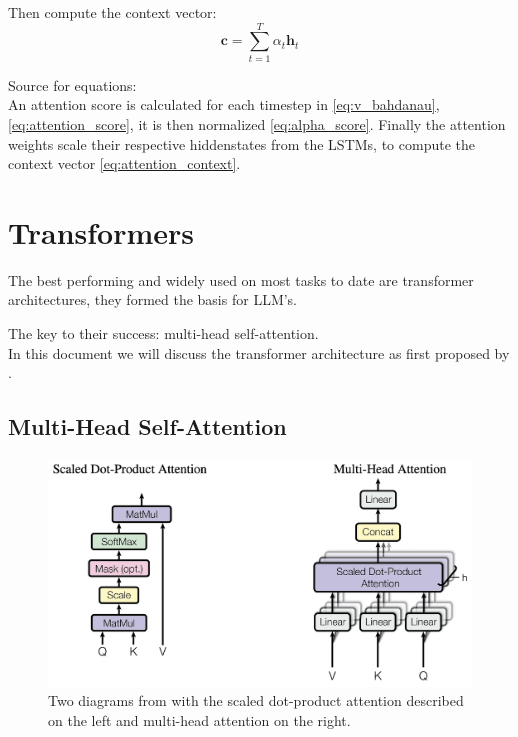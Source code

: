 \documentclass{article}
\begin{document}
Then compute the context vector:
\begin{equation}
    \mathbf{c} = \sum_{t=1}^{T} \alpha_t \mathbf{h}_t \label{eq:attention_context}
\end{equation}

Source for equations: \cite{cristina_2023_bahdanau}
\\[2em]
An attention score is calculated for each timestep in \eqref{eq:v_bahdanau}, 
\eqref{eq:attention_score}, it is then normalized \eqref{eq:alpha_score}. 
Finally the attention weights scale their respective hiddenstates from the 
LSTMs, to compute the context vector \eqref{eq:attention_context}.

\section{Transformers} \label{sec:transformers}

The best performing and widely used on most tasks to date are transformer 
architectures, they formed the basis for LLM's.

The key to their success: multi-head self-attention.
\\[2em]
In this document we will discuss the transformer architecture as first proposed 
by \cite{vaswani2023attentionneed}.
\subsection{Multi-Head Self-Attention}

\begin{figure}[htbp]
    \centering
    \includegraphics[width=0.5\paperwidth]{images/dotproduct_1.png}
    \caption{Two diagrams from \cite{vaswani2023attentionneed} with the scaled 
    dot-product attention described on the left and multi-head attention on the 
    right.}
    \label{fig:MHAttention}
\end{figure}
\end{document}
